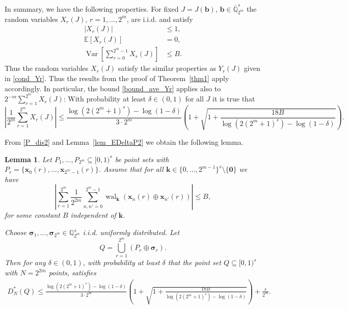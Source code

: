 \documentclass[12pt]{article}
\newtheorem{lemma}[theorem]{Lemma}
\theoremstyle{definition}
\numberwithin{equation}{section}
\begin{document}
In summary, we have the following properties. For fixed $J=J(\bm{b})$, $\bm{b} \in \overline{\mathbb{Q}}_{2^m}^s$ the random variables $X_r(J)$, $r=1,\ldots,2^m$, are i.i.d. and satisfy
\begin{align*}
|X_r(J)| & \le 1, \\ \mathbb{E}[ X_r(J)] & = 0, \\   \operatorname{Var} \left[ \sum_{r=0}^{2^m-1} X_r(J) \right] & \le B.
\end{align*}
Thus the random variables $X_r(J)$ satisfy the similar properties as $Y_r(J)$ given in \eqref{cond_Yr}. Thus the results from the proof of Theorem~\ref{thm1} apply accordingly. In particular, the bound \eqref{bound_ave_Yr} applies also to $2^{-m} \sum_{r=1}^{2^m} X_r(J)$:  With probability at least $\delta \in (0,1)$ for all $J$ it is true that
\begin{equation*}
\left| \frac{1}{2^m} \sum_{r=1}^{2^m} X_r(J) \right| \le \frac{\log(2 (2^m+1)^s) - \log(1-\delta)}{3 \cdot 2^m} \left(1   + \sqrt{1 + \frac{18 B}{\log(2 (2^m+1)^s) - \log(1-\delta) } } \right).
\end{equation*}


From \eqref{P_dis2} and Lemma~\ref{lem_EDeltaP2} we obtain the following lemma.

\begin{lemma}\label{lem_Pgen}
Let $P_1, \ldots, P_{2^m} \subseteq [0,1)^s$ be point sets with $P_r = \{\bm{x}_0(r), \ldots, \bm{x}_{2^m-1}(r)\}$. Assume that for all $\bm{k} \in \{0, \ldots, 2^{m-1}\}^s \setminus \{\bm{0}\}$ we have
\begin{equation*}%
\left| \sum_{r=1}^{2^m} \frac{1}{2^{2m}} \sum_{n, n'=0}^{2^m-1} \operatorname{wal}_{\bm{k}}(\bm{x}_n(r) \oplus \bm{x}_{n'}(r)) \right| \le B,
\end{equation*}
for some constant $B$ independent of $\bm{k}$.

Choose  $\bm{\sigma}_1, \ldots, \bm{\sigma}_{2^m} \in \mathbb{Q}_{2^m}^s$ i.i.d. uniformly distributed. Let
\begin{equation*}
Q = \bigcup_{r=1}^{2^m} (P_r \oplus \bm{\sigma}_r).
\end{equation*}
Then for any $\delta \in (0,1)$, with probability at least $\delta$ that the point set  $Q \subseteq [0,1)^s$ with $N = 2^{2 m}$ points, satisfies
\begin{align*}
D_N^\ast(Q) \le  \frac{\log(2 (2^m+1)^s) - \log(1-\delta)}{3 \cdot 2^m} \left(1   + \sqrt{1 + \frac{18 B}{\log(2 (2^m+1)^s) - \log(1-\delta) } } \right) + \frac{s}{2^m}.
\end{align*}
\end{lemma}
\end{document}
